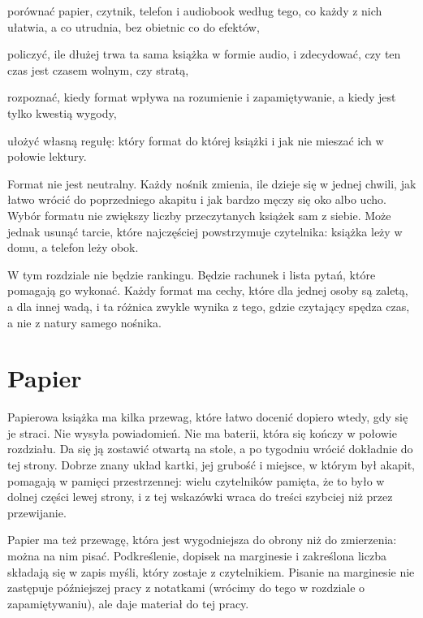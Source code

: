 
\begin{cele}
  \item porównać papier, czytnik, telefon i audiobook według tego, co każdy z nich ułatwia, a co utrudnia, bez obietnic co do efektów,
  \item policzyć, ile dłużej trwa ta sama książka w formie audio, i zdecydować, czy ten czas jest czasem wolnym, czy stratą,
  \item rozpoznać, kiedy format wpływa na rozumienie i zapamiętywanie, a kiedy jest tylko kwestią wygody,
  \item ułożyć własną regułę: który format do której książki i jak nie mieszać ich w połowie lektury.
\end{cele}

Format nie jest neutralny. Każdy nośnik zmienia, ile dzieje się w jednej chwili, jak łatwo wrócić do poprzedniego akapitu i jak bardzo męczy się oko albo ucho. Wybór formatu nie zwiększy liczby przeczytanych książek sam z siebie. Może jednak usunąć tarcie, które najczęściej powstrzymuje czytelnika: książka leży w domu, a telefon leży obok.

W tym rozdziale nie będzie rankingu. Będzie rachunek i lista pytań, które pomagają go wykonać. Każdy format ma cechy, które dla jednej osoby są zaletą, a dla innej wadą, i ta różnica zwykle wynika z tego, gdzie czytający spędza czas, a nie z natury samego nośnika.

\section{Papier}

Papierowa książka ma kilka przewag, które łatwo docenić dopiero wtedy, gdy się je straci. Nie wysyła powiadomień. Nie ma baterii, która się kończy w połowie rozdziału. Da się ją zostawić otwartą na stole, a po tygodniu wrócić dokładnie do tej strony. Dobrze znany układ kartki, jej grubość i miejsce, w którym był akapit, pomagają w pamięci przestrzennej: wielu czytelników pamięta, że \glqq to było w dolnej części lewej strony\grqq{}, i z tej wskazówki wraca do treści szybciej niż przez przewijanie.

Papier ma też przewagę, która jest wygodniejsza do obrony niż do zmierzenia: można na nim pisać. Podkreślenie, dopisek na marginesie i zakreślona liczba składają się w zapis myśli, który zostaje z czytelnikiem. Pisanie na marginesie nie zastępuje późniejszej pracy z notatkami (wrócimy do tego w rozdziale o zapamiętywaniu), ale daje materiał do tej pracy.

